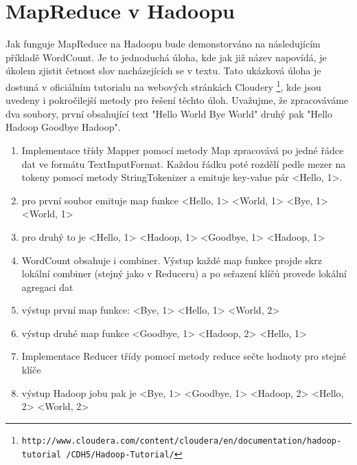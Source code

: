 \documentclass[thesis=M,czech]{FITthesis}[2012/06/26]
\begin{document}
\section{MapReduce v Hadoopu}
Jak funguje MapReduce na Hadoopu bude demonstorváno na následujícím příkladě WordCount. Je to jednoduchá úloha, kde jak již název napovídá, je úkolem zjistit četnost slov nacházejících se v textu. Tato ukázková úloha je dostuná v oficiálním tutorialu na webových stránkách Cloudery \footnote{\texttt{http://www.cloudera.com/content/cloudera/en/documentation/hadoop-tutorial /CDH5/Hadoop-Tutorial/}}, kde jsou uvedeny i pokročilejší metody pro řešení těchto úloh. Uvažujme, že zpracováváme dva soubory, první obsahující text "Hello World Bye World"  druhý pak "Hello Hadoop Goodbye Hadoop".
\begin{enumerate}
\item Implementace třídy Mapper pomocí metody Map zpracovává po jedné řádce dat ve formátu TextInputFormat. Každou řádku poté rozdělí pedle mezer na tokeny pomocí metody StringTokenizer a emituje key-value pár <Hello, 1>.
\item pro první soubor emituje map funkce <Hello, 1> <World, 1> <Bye, 1> <World, 1>
\item pro druhý to je <Hello, 1> <Hadoop, 1> <Goodbye, 1> <Hadoop, 1>
\item WordCount obsahuje i combiner. Výstup každé map funkce projde skrz lokální combiner (stejný jako v Reduceru) a po seřazení  klíčů provede lokální agregaci dat
\item výstup první map funkce: <Bye, 1> <Hello, 1> <World, 2>
\item výstup druhé map funkce  <Goodbye, 1> <Hadoop, 2> <Hello, 1>
\item Implementace Reducer třídy pomocí metody reduce sečte hodnoty pro stejné klíče
\item výstup Hadoop jobu pak je <Bye, 1> <Goodbye, 1> <Hadoop, 2> <Hello, 2> <World, 2>
\end{enumerate}
\pagebreak
\end{document}
